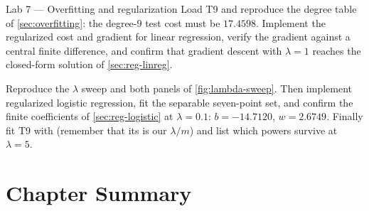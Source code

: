 \begin{labbox}{Lab 7 --- Overfitting and regularization}
Load T9 and reproduce the degree table of \cref{sec:overfitting}: the
degree-$9$ test cost must be $17.4598$. Implement the regularized cost and
gradient for linear regression, verify the gradient against a central finite
difference, and confirm that gradient descent with $\lambda = 1$ reaches the
closed-form solution of \cref{sec:reg-linreg}.

Reproduce the $\lambda$ sweep and both panels of \cref{fig:lambda-sweep}. Then
implement regularized logistic regression, fit the separable seven-point set,
and confirm the finite coefficients of \cref{sec:reg-logistic} at
$\lambda = 0.1$: $b = -14.7120$, $w = 2.6749$. Finally fit T9 with
 (remember that its  is our
$\lambda/m$) and list which powers survive at $\lambda = 5$.
\end{labbox}

\section*{Chapter Summary}

